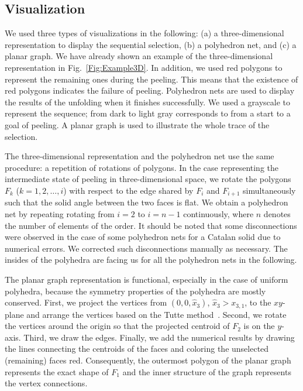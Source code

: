 \documentclass[12pt]{article}
\theoremstyle{plain}
\theoremstyle{definition}
\theoremstyle{remark}
\begin{document}
\subsection{Visualization}

We used three types of visualizations in the following:
(a) a three-dimensional representation to display the sequential
selection,
(b) a polyhedron net, and
(c) a planar graph.
We have already shown an example of the three-dimensional representation
in Fig.~\ref{Fig:Example3D}.
In addition, we used red polygons to represent the remaining ones during
the peeling.
This means that the existence of red polygons indicates the failure of
peeling.
Polyhedron nets are used to display the results of the unfolding when it
finishes successfully.
We used a grayscale to represent the sequence; from dark to light gray
corresponds to from a start to a goal of peeling.
A planar graph is used to illustrate the whole trace of the selection.

The three-dimensional representation and the polyhedron net use the same
procedure: a repetition of rotations of polygons.
In the case representing the intermediate state of peeling in
three-dimensional space, we rotate the polygons $F_k$ ($k=1,2,\ldots,i$)
with respect to the edge shared by $F_i$ and $F_{i+1}$ simultaneously
such that the solid angle between the two faces is flat.
We obtain a polyhedron net by repeating rotating from $i=2$ to $i=n-1$
continuously, where $n$ denotes the number of elements of the order.
It should be noted that some disconnections were observed in the case of
some polyhedron nets for a Catalan solid due to numerical errors.
We corrected such disconnections manually as necessary.
The insides of the polyhedra are facing us for all the polyhedron nets
in the following.

The planar graph representation is functional, especially in the case of
uniform polyhedra, because the symmetry properties of the polyhedra are
mostly conserved.
First, we project the vertices from $(0, 0, \hat{x}_3)$,
$\hat{x}_3 > x_{3,1}$, to the $xy$-plane and arrange the vertices based
on the Tutte method~\cite{Tutte}.
Second, we rotate the vertices around the origin so that the projected
centroid of $F_2$ is on the $y$-axis.
Third, we draw the edges.
Finally, we add the numerical results by drawing the lines connecting the
centroids of the faces and coloring the unselected (remaining) faces red.
Consequently, the outermost polygon of the planar graph represents the
exact shape of $F_1$ and the inner structure of the graph represents the
vertex connections.
\end{document}
